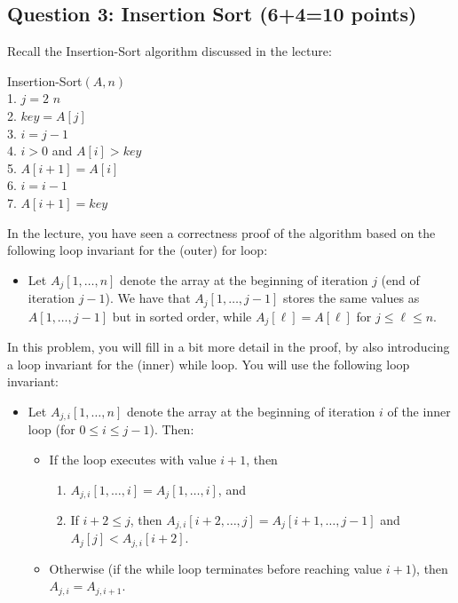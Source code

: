 \subsection*{Question 3: Insertion Sort (6+4=10 points)}

Recall the {\sc Insertion-Sort} algorithm discussed in the lecture:
\begin{code}
	{\sc Insertion-Sort}$(A,n)$\\
	1. \> \For $j=2$ \To $n$\\
	2. \> \> $key=A[j]$\\
	3. \> \> $i=j-1$\\
	4. \> \> \While $i>0$ and $A[i]>key$\\
	5. \> \> \> $A[i+1]=A[i]$\\
	6. \> \> \> $i=i-1$\\
	7. \> \> $A[i+1]=key$
\end{code}

\noindent
In the lecture, you have seen a correctness proof of the algorithm based on the following loop invariant for the (outer) for loop:
\begin{itemize}
	\item Let $A_j[1,\ldots,n]$ denote the array at the beginning of iteration $j$ (end of iteration $j-1$). We have that $A_j[1,\ldots,j-1]$ stores the same values as $A[1,\ldots,j-1]$ but in sorted order, while $A_j[\ell] = A[\ell]$ for $j \leq \ell \leq n$. 
\end{itemize}
In this problem, you will fill in a bit more detail in the proof, by also introducing a loop invariant for the (inner) while loop. You will use the following loop invariant:
\begin{itemize}
	\item Let $A_{j,i}[1,\ldots,n]$ denote the array at the beginning of iteration $i$ of the inner loop (for $0 \leq i \leq j-1$). 
    Then:
    \begin{itemize}
        \item If the loop executes with value $i+ 1$, then 
        \begin{enumerate}[nosep]
		\item $A_{j,i}[1,\ldots,i] = A_j[1,\ldots,i]$, and
		\item If $i+2 \leq j$, then $A_{j,i}[i+2,\ldots,j] = A_j[i+1,\ldots,j-1]$ and $A_j[j] < A_{j,i}[i+2]$.
	\end{enumerate}
 \item Otherwise (if the while loop terminates before reaching value $i + 1$), then $A_{j,i} = A_{j,i+1}$.
    \end{itemize}

\end{itemize}

